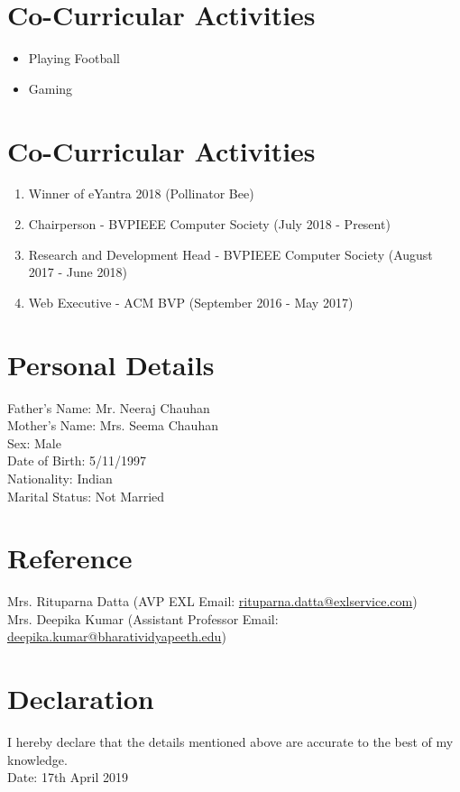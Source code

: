 \documentclass{article}
\begin{document}
\section{Co-Curricular Activities}

\begin{itemize}
\item Playing Football
\item Gaming 
\end{itemize}

\section{Co-Curricular Activities}

\begin{enumerate}
\item Winner of eYantra 2018 (Pollinator Bee)
\item Chairperson - BVPIEEE Computer Society (July 2018 - Present)
\item Research and Development Head - BVPIEEE Computer Society (August 2017 - June 2018)
\item Web Executive - ACM BVP (September 2016 - May 2017)
\end{enumerate}

\section{Personal Details}
Father's Name: Mr. Neeraj Chauhan
\\ Mother's Name: Mrs. Seema Chauhan
\\ Sex: Male
\\ Date of Birth: 5/11/1997
\\ Nationality: Indian
\\ Marital Status: Not Married

\section{Reference}
Mrs. Rituparna Datta (AVP EXL Email: \href{mailto:rituparna.datta@exlservice.com}{rituparna.datta@exlservice.com})
\\Mrs. Deepika Kumar (Assistant Professor Email: \href{mailto:deepika.kumar@bharatividyapeeth.edu}{deepika.kumar@bharatividyapeeth.edu})

\section{Declaration}
I hereby declare that the details mentioned above are accurate to the best of my knowledge.
\\Date: 17th April 2019
\end{document}
